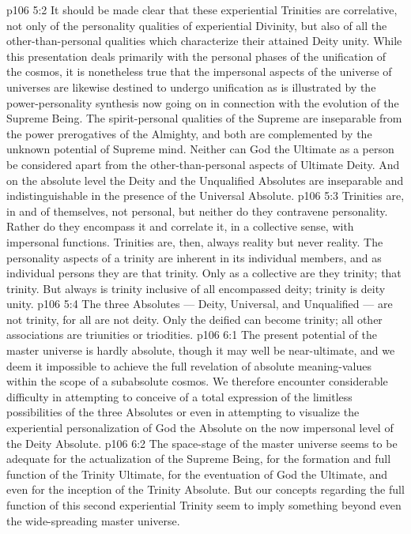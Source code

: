 \vs p106 5:2 It should be made clear that these experiential Trinities are correlative, not only of the personality qualities of experiential Divinity, but also of all the other\hyp{}than\hyp{}personal qualities which characterize their attained Deity unity. While this presentation deals primarily with the personal phases of the unification of the cosmos, it is nonetheless true that the impersonal aspects of the universe of universes are likewise destined to undergo unification as is illustrated by the power\hyp{}personality synthesis now going on in connection with the evolution of the Supreme Being. The spirit\hyp{}personal qualities of the Supreme are inseparable from the power prerogatives of the Almighty, and both are complemented by the unknown potential of Supreme mind. Neither can God the Ultimate as a person be considered apart from the other\hyp{}than\hyp{}personal aspects of Ultimate Deity. And on the absolute level the Deity and the Unqualified Absolutes are inseparable and indistinguishable in the presence of the Universal Absolute.
\vs p106 5:3 Trinities are, in and of themselves, not personal, but neither do they contravene personality. Rather do they encompass it and correlate it, in a collective sense, with impersonal functions. Trinities are, then, always  reality but never  reality. The personality aspects of a trinity are inherent in its individual members, and as individual persons they are  that trinity. Only as a collective are they trinity; that  trinity. But always is trinity inclusive of all encompassed deity; trinity is deity unity.
\vs p106 5:4 The three Absolutes --- Deity, Universal, and Unqualified --- are not trinity, for all are not deity. Only the deified can become trinity; all other associations are triunities or triodities.
\vs p106 6:1 The present potential of the master universe is hardly absolute, though it may well be near\hyp{}ultimate, and we deem it impossible to achieve the full revelation of absolute meaning\hyp{}values within the scope of a subabsolute cosmos. We therefore encounter considerable difficulty in attempting to conceive of a total expression of the limitless possibilities of the three Absolutes or even in attempting to visualize the experiential personalization of God the Absolute on the now impersonal level of the Deity Absolute.
\vs p106 6:2 The space\hyp{}stage of the master universe seems to be adequate for the actualization of the Supreme Being, for the formation and full function of the Trinity Ultimate, for the eventuation of God the Ultimate, and even for the inception of the Trinity Absolute. But our concepts regarding the full function of this second experiential Trinity seem to imply something beyond even the wide\hyp{}spreading master universe.
